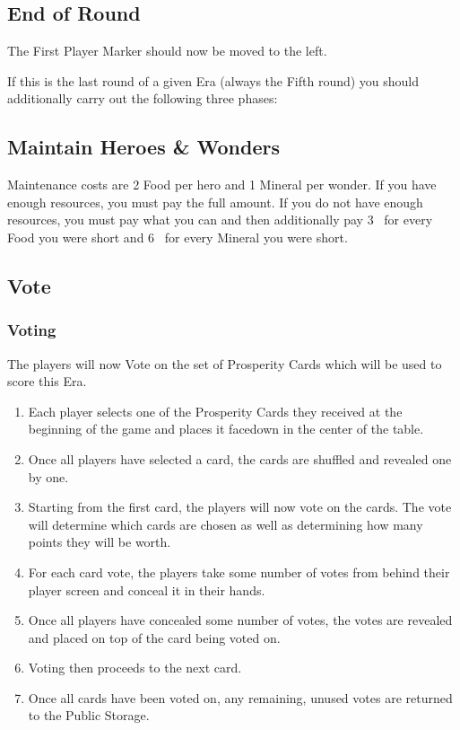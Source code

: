 \documentclass[10pt,twocolumn]{article}
\begin{document}
\subsection{End of Round}
The First Player Marker should now be moved to the left.

If this is the last round of a given Era (always the Fifth round) you should additionally carry out the following three phases:

\subsection{Maintain Heroes \& Wonders}
Maintenance costs are 2 Food per hero and 1 Mineral per wonder. If you have enough resources, you must pay the full amount. If you do not have enough resources, you must pay what you can and then additionally pay 3 \vps\ for every Food you were short and 6 \vps\ for every Mineral you were short.
\subsection{Vote}
\subsubsection{Voting}
The players will now Vote on the set of Prosperity Cards which will be used to score this Era.
\begin{enumerate}
\item Each player selects one of the Prosperity Cards they received at the beginning of the game and places it facedown in the center of the table.
\item Once all players have selected a card, the cards are shuffled and revealed one by one.
\item Starting from the first card, the players will now vote on the cards. The vote will determine which cards are chosen as well as determining how many points they will be worth.
\item For each card vote, the players take some number of votes from behind their player screen and conceal it in their hands. 
\item Once all players have concealed some number of votes, the votes are revealed and placed on top of the card being voted on.
\item Voting then proceeds to the next card.
\item Once all cards have been voted on, any remaining, unused votes are returned to the Public Storage.
\end{enumerate}
\end{document}
